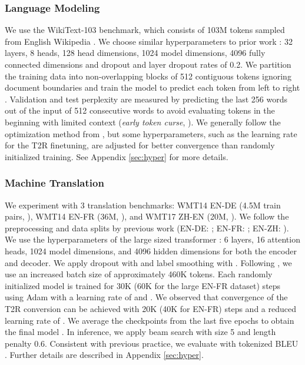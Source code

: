 \documentclass[11pt]{article}
\newcommand{\TRNN}{T2R\xspace}
\begin{document}
\subsubsection{Language Modeling}
We use the WikiText-103 benchmark, which consists of 103M tokens sampled from English Wikipedia \cite{wiki103}.
We choose similar hyperparameters to prior work \cite{Baevski2019AdaptiveIR, layerdrop}: 32 layers, 8 heads, 128 head dimensions, 1024 model dimensions, 4096 fully connected dimensions and dropout \cite{dropout} and layer dropout rates of 0.2.
We partition the training data into non-overlapping blocks of 512 contiguous tokens ignoring document boundaries and train the model to predict each token from left to right \cite{Baevski2019AdaptiveIR}.
Validation and test perplexity are measured by predicting the last 256 words out of the input of 512 consecutive words to avoid evaluating tokens in the beginning with limited context (\textit{early token curse}, \citealp{shortformer}).
We generally follow the optimization method from \citet{Baevski2019AdaptiveIR}, but some hyperparameters, such as the learning rate for the \TRNN finetuning, are adjusted for better convergence than randomly initialized training.
See Appendix \ref{sec:hyper} for more details.



\subsubsection{Machine Translation}
We experiment with 3 translation benchmarks: WMT14 EN-DE (4.5M train pairs, \citealp{wmt2016-findings}), WMT14 EN-FR (36M, \citealp{wmt2014-findings}), and WMT17 ZH-EN (20M, \citealp{wmt2017-findings}).
We follow the preprocessing and data splits by previous work (EN-DE: \citealp{Vaswani2017AttentionIA}; EN-FR: \citealp{Gehring2017ConvolutionalST}; EN-ZH: \citealp{Hassan2018AchievingHP}).
We use the hyperparameters of the large sized transformer \cite{Vaswani2017AttentionIA}: 6 layers, 16 attention heads, 1024 model dimensions, and 4096 hidden dimensions for both the encoder and decoder.
We apply dropout with  and label smoothing with .
Following \citet{Ott2018ScalingNM}, we use an increased batch size of approximately 460K tokens.
Each randomly initialized model is trained for 30K (60K for the large EN-FR dataset) steps using Adam with a learning rate of  and  \cite{Kingma2014AdamAM}.
We observed that convergence of the \TRNN conversion can be achieved with 20K (40K for EN-FR) steps and a reduced learning rate of .
We average the checkpoints from the last five epochs to obtain the final model \cite{Vaswani2017AttentionIA}.
In inference, we apply beam search with size 5 and length penalty 0.6.
Consistent with previous practice, we evaluate with tokenized BLEU \cite{Papineni2001BleuAM}.
Further details are described in Appendix \ref{sec:hyper}.
\end{document}
